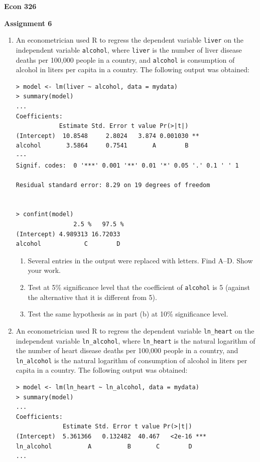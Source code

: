 \documentclass[12pt]{article}
\begin{document}
\begin{center}
\textbf{Econ 326}

\textbf{Assignment 6}
\end{center}

\begin{enumerate}


\item An econometrician used R to regress the dependent variable \verb!liver! on the independent variable \verb!alcohol!, where \verb!liver! is the number of liver disease deaths per 100,000 people in a country, and \verb!alcohol! is consumption of alcohol in liters per capita in a country. The following output was obtained:
\small
\begin{verbatim}
> model <- lm(liver ~ alcohol, data = mydata)
> summary(model)
...
Coefficients:
            Estimate Std. Error t value Pr(>|t|)
(Intercept)  10.8548     2.8024   3.874 0.001030 **
alcohol       3.5864     0.7541       A        B
---
Signif. codes:  0 '***' 0.001 '**' 0.01 '*' 0.05 '.' 0.1 ' ' 1

Residual standard error: 8.29 on 19 degrees of freedom


> confint(model)
                2.5 %   97.5 %
(Intercept) 4.989313 16.72033
alcohol            C        D
\end{verbatim}
\normalsize
\begin{enumerate}
\item Several entries in the output were replaced with letters. Find A--D. Show your work.
\item Test at 5\% significance level that the coefficient of \verb!alcohol! is 5 (against the alternative that it is different from 5). \label{it:test}
\item Test the same hypothesis as in part (b) at 10\% significance level.
\end{enumerate}

\item An econometrician used R to regress the dependent variable \verb!ln_heart! on the independent variable \verb!ln_alcohol!, where \verb!ln_heart! is the natural logarithm of the number of heart disease deaths per 100,000 people in a country, and \verb!ln_alcohol! is the natural logarithm of consumption of alcohol in liters per capita in a country. The following output was obtained:
\small
\begin{verbatim}
> model <- lm(ln_heart ~ ln_alcohol, data = mydata)
> summary(model)
...
Coefficients:
             Estimate Std. Error t value Pr(>|t|)
(Intercept)  5.361366   0.132482  40.467   <2e-16 ***
ln_alcohol          A          B       C        D
...


\end{verbatim}
\end{enumerate}
\end{document}
